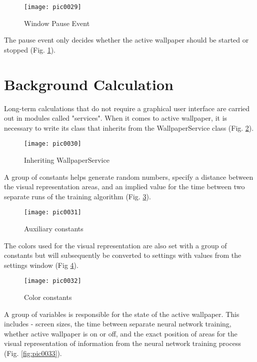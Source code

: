 \begin{figure}[h]
\centering
\texttt{[image: pic0029]}
\caption{Window Pause Event}
\label{fig:pic0029}
\end{figure}
\FloatBarrier

The pause event only decides whether the active wallpaper should be started or stopped (Fig. \ref{fig:pic0029}).

\section{Background Calculation}

Long-term calculations that do not require a graphical user interface are carried out in modules called "services". When it comes to active wallpaper, it is necessary to write its class that inherits from the WallpaperService class (Fig. \ref{fig:pic0030}).

\begin{figure}[h]
\centering
\texttt{[image: pic0030]}
\caption{Inheriting WallpaperService}
\label{fig:pic0030}
\end{figure}
\FloatBarrier

A group of constants helps generate random numbers, specify a distance between the visual representation areas, and an implied value for the time between two separate runs of the training algorithm (Fig. \ref{fig:pic0031}).

\begin{figure}[h]
\centering
\texttt{[image: pic0031]}
\caption{Auxiliary constants}
\label{fig:pic0031}
\end{figure}
\FloatBarrier

The colors used for the visual representation are also set with a group of constants but will subsequently be converted to settings with values from the settings window (Fig \ref{fig:pic0032}).

\begin{figure}[h]
\centering
\texttt{[image: pic0032]}
\caption{Color constants}
\label{fig:pic0032}
\end{figure}
\FloatBarrier

A group of variables is responsible for the state of the active wallpaper. This includes - screen sizes, the time between separate neural network training, whether active wallpaper is on or off, and the exact position of areas for the visual representation of information from the neural network training process (Fig. \ref{fig:pic0033}).

